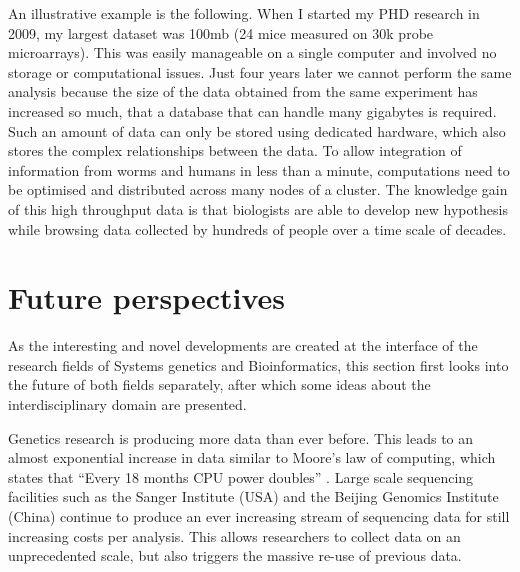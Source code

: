 An illustrative example is the following. When I started my PHD research in 2009, my largest dataset was 100mb (24 mice measured on 30k probe 
microarrays). This was easily manageable on a single computer and involved no storage or computational issues. Just four years later we cannot 
perform the same analysis because the size of the data obtained from the same experiment has increased so much, that a database that can handle 
many gigabytes is required. Such an amount of data can only be stored using dedicated hardware, which also stores the complex relationships 
between the data. To allow integration of information from worms and humans in less than a minute, computations need to be optimised and 
distributed across many nodes of a cluster. The knowledge gain of this high throughput data is that biologists are able to develop new 
hypothesis while browsing data collected by hundreds of people over a time scale of decades. 

\section{Future perspectives}
As the interesting and novel developments are created at the interface of the research fields of Systems genetics and Bioinformatics, this 
section first looks into the future of both fields separately, after which some ideas about the interdisciplinary domain are presented.  

Genetics research is producing more data than ever before. This leads to an almost exponential increase in data similar to Moore's law of 
computing, which states that “Every 18 months CPU power doubles” \cite{Moore:1998, Editorial:2009}. Large scale sequencing facilities such as the Sanger Institute (USA) and 
the Beijing Genomics Institute (China) continue to produce an ever increasing stream of sequencing data for still increasing costs per 
analysis. This allows researchers to collect data on an unprecedented scale, but also triggers the massive re-use of previous data.  

